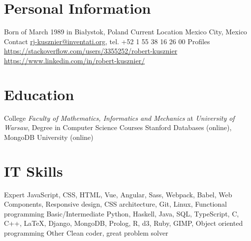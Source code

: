 

\section{Personal Information}

\begin{sectionlist}
    \sectionlistitem
        {Born}
        { of March 1989 in Bia\l{}ystok, Poland}
    \sectionlistitem
        {Current Location}
        {Mexico City, Mexico}
    \sectionlistitem
        {Contact}
        {
            \href{mailto:rj-kusznier@inventati.org}{rj-kusznier@inventati.org},
            tel. +52 1 55 38 16 26 00
        }
    \sectionlistitem
        {Profiles}
        {
            \url{https://stackoverflow.com/users/3355252/robert-kusznier} \\
            \url{https://www.linkedin.com/in/robert-kusznier/}
        }
\end{sectionlist}


\section{Education}

\begin{sectionlist}
    \sectionlistitem
        {College}
        {
            \emph{Faculty of Mathematics, Informatics and Mechanics} at
            \emph{University of Warsaw}, Degree in Computer
            Science
        }
    \sectionlistitem
        {Courses}
        {Stanford Databases (online), MongoDB University (online)}
\end{sectionlist}


\section{IT Skills}

\begin{sectionlist}
    \sectionlistitem
        {Expert}
        {
            JavaScript, CSS, HTML, Vue, Angular, Sass, Webpack, Babel, Web
            Components, Responsive design, CSS architecture, Git, Linux,
            Functional programming
        }
    \sectionlistitem
        {Basic/Intermediate}
        {
            Python, Haskell, Java, SQL, TypeScript, C, C++, \LaTeX, Django,
            MongoDB, Prolog, R, d3, Ruby, GIMP, Object oriented programming
        }
    \sectionlistitem
        {Other}
        {Clean coder, great problem solver}
\end{sectionlist}


